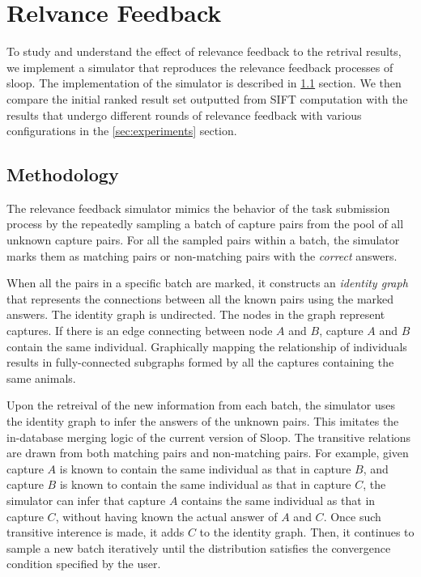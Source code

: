 \graphicspath{{./images/chap4/}}
\chapter{Relvance Feedback}
\label{chap:relevance_feedback}

To study and understand the effect of relevance feedback to the retrival results, we implement a simulator that reproduces the relevance feedback processes of sloop. The implementation of the simulator is described in \ref{sec:method} section. We then compare the initial ranked result set outputted from SIFT computation with the results that undergo different rounds of relevance feedback with various configurations in the \ref{sec:experiments} section.

\section{Methodology}
\label{sec:method}
The relevance feedback simulator mimics the behavior of the task submission process by the repeatedly sampling a batch of capture pairs from the pool of all unknown capture pairs. For all the sampled pairs within a batch, the simulator marks them as matching pairs or non-matching pairs with the \emph{correct} answers.

When all the pairs in a specific batch are marked, it constructs an \emph{identity graph} that represents the connections between all the known pairs using the marked answers. The identity graph is undirected. The nodes in the graph represent captures. If there is an edge connecting between node $A$ and $B$, capture $A$ and $B$ contain the same individual. Graphically mapping the relationship of individuals results in fully-connected subgraphs formed by all the captures containing the same animals.

Upon the retreival of the new information from each batch, the simulator uses the identity graph to infer the answers of the unknown pairs. This imitates the in-database merging logic of the current version of Sloop\cite{sloopdocs}. The transitive relations are drawn from both matching pairs and non-matching pairs. For example, given capture $A$ is known to contain the same individual as that in capture $B$, and capture $B$ is known to contain the same individual as that in capture $C$, the simulator can infer that capture $A$ contains the same individual as that in capture $C$, without having known the actual answer of $A$ and $C$. Once such transitive interence is made, it adds $C$ to the identity graph. Then, it continues to sample a new batch iteratively until the distribution satisfies the convergence condition specified by the user.

